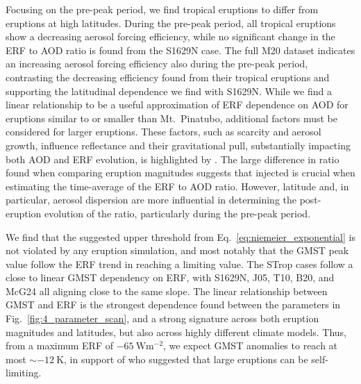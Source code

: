\documentclass[draft]{agujournal2019}
\begin{document}
  Focusing on the pre-peak period, we find tropical eruptions to differ from eruptions
  at high latitudes. During the pre-peak period, all tropical eruptions show a
  decreasing aerosol forcing efficiency, while no significant change in the ERF to AOD
  ratio is found from the S1629N case. The full M20 dataset indicates an increasing
  aerosol forcing efficiency also during the pre-peak period, contrasting the decreasing
  efficiency found from their tropical eruptions and supporting the latitudinal
  dependence we find with S1629N. While we find a linear relationship to be a useful
  approximation of ERF dependence on AOD for eruptions similar to or smaller than Mt.\
  Pinatubo, additional factors must be considered for larger eruptions. These factors,
  such as \ce{OH} scarcity and aerosol growth, influence reflectance and their
  gravitational pull, substantially impacting both AOD and ERF evolution, is highlighted
  by \citeA{timmreck2010}. The large difference in ratio found when comparing eruption
  magnitudes suggests that injected \ce{SO2} is crucial when estimating the time-average
  of the ERF to AOD ratio. However, latitude and, in particular, aerosol dispersion are
  more influential in determining the post-eruption evolution of the ratio, particularly
  during the pre-peak period.

  We find that the suggested upper threshold from Eq.~\ref{eq:niemeier_exponential} is
  not violated by any eruption simulation, and most notably that the GMST peak value
  follow the ERF trend in reaching a limiting value. The STrop cases follow a close to
  linear GMST dependency on ERF, with S1629N, J05, T10, B20, and McG24 all aligning
  close to the same slope. The linear relationship between GMST and ERF is the strongest
  dependence found between the parameters in Fig.~\ref{fig:4_parameter_scan}, and a
  strong signature across both eruption magnitudes and latitudes, but also across highly
  different climate models. Thus, from a maximum ERF of \(\SI{-65}{\watt\metre^{-2}}\),
  we expect GMST anomalies to reach at most \(\sim\SI{-12}{\kelvin}\), in support of
  \citeA{english2013} who suggested that large eruptions can be self-limiting.
\end{document}
